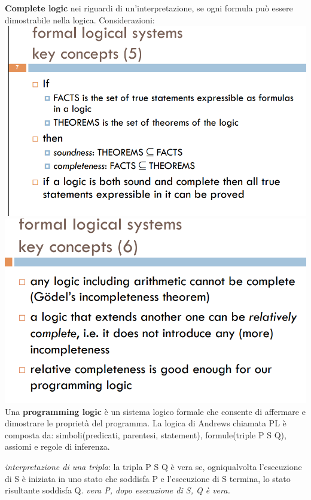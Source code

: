 \documentclass[10pt,a4paper]{article}
\begin{document}
\textbf{Complete logic} nei riguardi di un'interpretazione, se ogni formula può essere dimostrabile nella logica.
\newpage
Considerazioni:\\
\includegraphics[scale=0.45]{img/considerazioni.png} \\
\includegraphics[scale=0.45]{img/considerazioni2.png} \\
\newpage
Una \textbf{programming logic} è un sistema logico formale che consente di affermare e dimostrare le proprietà del programma.
La logica di Andrews chiamata PL è composta da: simboli(predicati, parentesi, statement), formule(triple {P} S {Q}), assiomi e regole di inferenza.

\textit{interpretazione di una tripla}: la tripla {P} S {Q} è vera se, ogniqualvolta l'esecuzione di S è iniziata in uno stato che soddisfa P e l'esecuzione di S termina, lo stato risultante soddisfa Q.
\textit{vera P, dopo esecuzione di S, Q è vera.}
\end{document}
